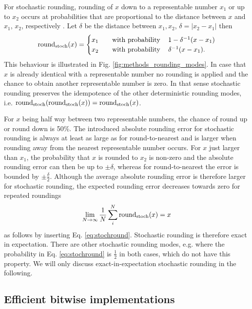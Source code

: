 For stochastic rounding, rounding of $x$ down to a representable number $x_1$ or up to $x_2$ occurs at probabilities
that are proportional to the distance between $x$ and $x_1$, $x_2$, respectively
\citep{Hohfeld1992,Muller2015,Gupta2015,Mikaitis2020,Croci2020}. Let $\delta$ be the distance between
$x_1,x_2$, $\delta = \vert x_2 - x_1 \vert$ then
\begin{equation}
\operatorname{round}_{\operatorname{stoch}}(x) =
\begin{cases}
x_1 \quad &\operatorname{with~probability}\quad 1 - \delta^{-1}(x - x_1)  \\
x_2 &\operatorname{with~probability}\quad  \delta^{-1}(x - x_1).
\end{cases}
\label{eq:stochround}
\end{equation}
This behaviour is illustrated in Fig. \ref{fig:methods_rounding_modes}. In case that $x$ is already identical with a
representable number no rounding is applied and the chance to obtain another representable number is zero.
In that sense stochastic rounding preserves the idempotence of the other deterministic rounding modes, i.e.
$\operatorname{round}_{\operatorname{stoch}}(\operatorname{round}_{\operatorname{stoch}}(x)) = \operatorname{round}_{\operatorname{stoch}}(x)$.

For $x$ being half way between two representable numbers, the chance of round up or round down is 50\%.
The introduced absolute rounding error for stochastic rounding is always at least as large as for round-to-nearest
and is larger when rounding away from the nearest representable number occurs. For $x$ just larger than $x_1$,
the probability that $x$ is rounded to $x_2$ is non-zero and the absolute rounding error can then be up to
$\pm \delta$, whereas for round-to-nearest the error is bounded by $\pm \tfrac{\delta}{2}$.  Although the average
absolute rounding error is therefore larger for stochastic rounding, the expected rounding error
decreases towards zero for repeated roundings
\begin{equation}
\lim_{N\to \infty}\frac{1}{N} \sum_i^N \operatorname{round}_{\operatorname{stoch}}(x) = x
\end{equation}
as follows by inserting Eq. \ref{eq:stochround}. Stochastic rounding is therefore exact in expectation. There are
other stochastic rounding modes, e.g. where the probability in Eq. \ref{eq:stochround} is $\tfrac{1}{2}$ in both
cases, which do not have this property. We will only discuss exact-in-expectation stochastic rounding in the
following.

\subsection{Efficient bitwise implementations}
\label{sec:bitwiseop}


